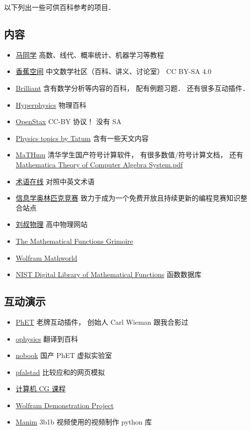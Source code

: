 
以下列出一些可供百科参考的项目．

\subsection{内容}
\begin{itemize}
\item \href{https://www.matongxue.com/}{马同学} 高数、线代、概率统计、机器学习等教程
\item \href{https://www.bananaspace.org/wiki/}{香蕉空间} 中文数学社区（百科、讲义、讨论室） CC BY-SA 4.0
\item \href{https://brilliant.org/}{Brilliant} 含有数学分析等内容的百科， 配有例题习题． 还有很多互动插件．
\item \href{http://hyperphysics.phy-astr.gsu.edu/}{Hyperphysics} 物理百科
\item \href{https://openstax.org/}{OpenStax} CC-BY 协议！ 没有 SA
\item \href{http://www.astro.uvic.ca/~tatum/index.php}{Physics topics by Tatum} 含有一些天文内容
\item \href{http://mathmu.github.io/MTCAS/RecentChanges.html}{MaTHmu} 清华学生国产符号计算软件， 有很多数值/符号计算文档， 还有 \href{https://github.com/maTHmU/MTCAS}{Mathematica Theory of Computer Algebra System.pdf}
\item \href{https://www.termonline.cn/index}{术语在线} 对照中英文术语
\item \href{https://oi-wiki.org/}{信息学奥林匹克竞赛} 致力于成为一个免费开放且持续更新的编程竞赛知识整合站点
\item \href{http://www.myliushu.com/}{刘叔物理} 高中物理网站
\item \href{https://fungrim.org/}{The Mathematical Functions Grimoire}
\item \href{https://mathworld.wolfram.com/}{Wolfram Mathworld}
\item \href{https://dlmf.nist.gov/}{NIST Digital Library of Mathematical Functions} 函数数据库
\end{itemize}

\subsection{互动演示}
\begin{itemize}
\item \href{https://phet.colorado.edu/}{PhET} 老牌互动插件， 创始人 Carl Wieman 跟我合影过
\item \href{https://ophysics.com/}{ophysics} 翻译到百科
\item \href{https://www.nobook.com/}{nobook} 国产 PhET 虚拟实验室
\item \href{https://www.falstad.com/}{pfalstad} 比较应和的网页模拟
\item \href{http://www.cs.cornell.edu/courses/cs5643/2010sp/}{计算机 CG 课程}
\item \href{https://demonstrations.wolfram.com/topics.php?PhysicalSciences#5}{Wolfram Demonstration Project}
\item \href{https://github.com/3b1b/manim}{Manim} 3b1b 视频使用的视频制作 python 库
\end{itemize}

